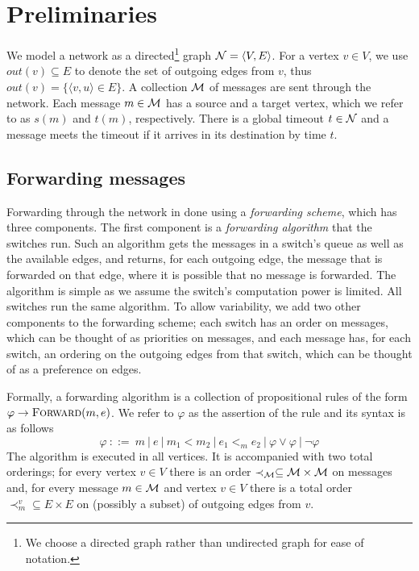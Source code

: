 \documentclass[11pt,eepic]{article}
\newcommand{\zug}[1]{\langle #1  \rangle}
\newcommand{\set}[1]{\{ #1  \}}
\newcommand{\N}{{\cal N}}
\newcommand{\M}{{\cal M}}
\newcommand{\Forw}{\mbox{\sc Forward}}
\begin{document}
\section{Preliminaries}
	We model a network as a directed\footnote{We choose a directed graph rather than undirected graph for ease of notation.} graph $\N = \zug{V, E}$.
	For a vertex $v \in V$, we use $out(v) \subseteq E$ to denote the set of outgoing edges from $v$, thus $out(v) = \set{\zug{v, u} \in E}$. A collection $\M$ of messages are sent through the network.
	Each message $m \in \M$ has a source and a target vertex, which we refer to as $s(m)$ and $t(m)$, respectively. There is a global timeout $t \in \N$ and a message meets the timeout if it arrives in its destination by time $t$.



	\subsection*{Forwarding messages}
		Forwarding through the network in done using a {\em forwarding scheme}, which has three components. The first component is a {\em forwarding algorithm} that the switches run. Such an algorithm gets the messages in a switch's queue as well as the available edges, and returns, for each outgoing edge, the message that is forwarded on that edge, where it is possible that no message is forwarded. The algorithm is simple as we assume the switch's computation power is limited. All switches run the same algorithm. To allow variability, we add two other components to the forwarding scheme; each switch has an order on messages, which can be thought of as priorities on messages, and each message has, for each switch, an ordering on the outgoing edges from that switch, which can be thought of as a preference on edges.  

		Formally, a forwarding algorithm is a collection of propositional rules of the form $\varphi \rightarrow \Forw(m,e)$. We refer to $\varphi$ as the assertion of the rule and its syntax is as follows
		\[\varphi \ ::= \ m \ | \ e \ | \  m_1 < m_2 \ | \ e_1 <_m e_2  \ | \ \varphi \vee \varphi \ | \ \neg \varphi
		\]
		The algorithm is executed in all vertices. It is accompanied with two total orderings; for every vertex $v \in V$ there is an order $\prec_\M \subseteq \M \times \M$ on messages and, for every message $m \in \M$ and vertex $v \in V$ there is a total order $\prec_m^v \subseteq E \times E$ on (possibly a subset) of outgoing edges from $v$. 
\end{document}
